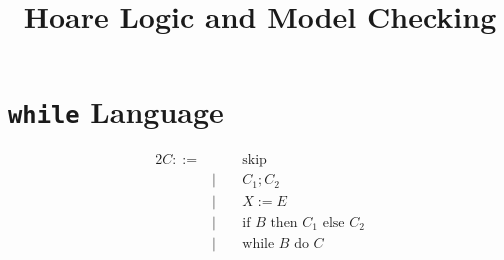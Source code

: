 \documentclass[11pt]{article}
\title{\vspace{-1cm}Hoare Logic and Model Checking\vspace{-1cm}}
\author{}
\date{}
\begin{document}
\maketitle
\section*{\texttt{while} Language}
{
    \begin{alignat*}{2}
    C ::=& \; &\;&\text{skip} \\
         & | &&C_1 ; C_2 \\
         & | &&X := E \\
         & | &&\text{if }B\text{ then }C_1\text{ else }C_2 \\
         & | &&\text{while }B\text{ do }C
    \end{alignat*}
}
\end{document}
